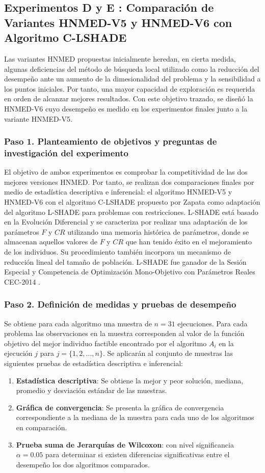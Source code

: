 \subsection{Experimentos D y E : Comparación de Variantes HNMED-V5 y HNMED-V6 con Algoritmo C-LSHADE}
Las variantes HNMED propuestas inicialmente heredan, en cierta medida, algunas deficiencias del método de búsqueda local utilizado como la reducción del desempeño ante un aumento de la dimesionalidad del problema y la sensibilidad a los puntos iniciales. Por tanto, una mayor capacidad de exploración es requerida en orden de alcanzar mejores resultados. Con este objetivo trazado, se diseñó la HNMED-V6 cuyo desempeño es medido en los experimentos finales junto a la variante HNMED-V5.

\subsubsection{Paso 1. Planteamiento de objetivos y preguntas de investigación del experimento}

El objetivo de ambos experimentos es comprobar la competitividad  de las dos mejores versiones HNMED. Por tanto, se realizan dos comparaciones finales por medio de estadística descriptiva e inferencial: el algoritmo HNMED-V5 y HNMED-V6 con el algoritmo C-LSHADE propuesto por Zapata \cite{zapata_zapata_control_2017} como adaptación del algoritmo L-SHADE para problemas con restricciones. L-SHADE está basado en la Evolución Diferencial y se caracteriza por realizar una adaptación de los parámetros $F$ y $CR$ utilizando una memoria histórica de parámetros, donde se almacenan aquellos valores de $F$ y $CR$ que han tenido éxito en el mejoramiento de los individuos. Su procedimiento también incorpora
un mecanismo de reducción lineal del tamaño de población. L-SHADE fue ganador de la Sesión
Especial y Competencia de Optimización Mono-Objetivo con Parámetros Reales
CEC-2014 \cite{tanabe2014improving}. 
\subsubsection{Paso 2. Definición de medidas y pruebas de desempeño}
Se obtiene para cada algoritmo una muestra de $n=31$ ejecuciones. Para cada problema las observaciones en la muestra corresponden al valor de la función objetivo del mejor individuo factible encontrado por el algoritmo $A_i$ en la ejecución $j$ para $j= \{ 1,2,...,n\}$. Se aplicarán al conjunto de muestras las siguientes pruebas de estadística descriptiva e inferencial:
\begin{enumerate}
	\item \textbf{Estadística descriptiva}: Se obtiene la mejor y peor solución, mediana, promedio y desviación estándar de las muestras.
	\item \textbf{Gráfica de convergencia}: Se presenta la gráfica de convergencia correspondiente a la mediana de la muestra para cada uno de los algoritmos en comparación.
	\item \textbf{Prueba suma de Jerarquías de Wilcoxon}: con nivel significancia $\alpha=0.05$ para determinar si existen diferencias significativas entre el desempeño los dos algoritmos comparados. 
	
\end{enumerate}
